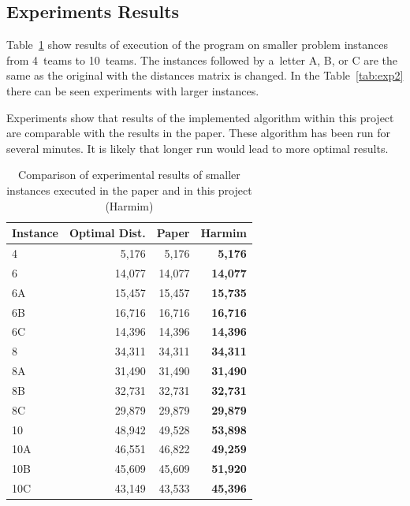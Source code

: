 \documentclass[a4paper, 10pt, twocolumn]{article}
\begin{document}
    \subsection{Experiments Results}

    Table~\ref{tab:exp1} show results of execution of the program on
    smaller problem instances from 4~teams to 10~teams. The instances
    followed by a~letter A, B, or C are the same as the original with
    the distances matrix is changed. In the Table~\ref{tab:exp2} there
    can be seen experiments with larger instances.

    Experiments show that results of the implemented algorithm within this
    project are comparable with the results in the paper. These algorithm
    has been run for several minutes. It is likely that longer run would
    lead to more optimal results.

    \begin{table}[hbt]
        \centering

        \begin{tabular}{|l||r|r|r|}
            \hline
            Instance & Optimal Dist. & Paper & \textbf{Harmim} \\
            \hline \hline

            4 & 5,176 & 5,176 & \textbf{5,176} \\ \hline
            6 & 14,077 & 14,077 & \textbf{14,077} \\ \hline
            6A & 15,457 & 15,457 & \textbf{15,735} \\ \hline
            6B & 16,716 & 16,716 & \textbf{16,716} \\ \hline
            6C & 14,396 & 14,396 & \textbf{14,396} \\ \hline
            8 & 34,311 & 34,311 & \textbf{34,311} \\ \hline
            8A & 31,490 & 31,490 & \textbf{31,490} \\ \hline
            8B & 32,731 & 32,731 & \textbf{32,731} \\ \hline
            8C & 29,879 & 29,879 & \textbf{29,879} \\ \hline
            10 & 48,942 & 49,528 & \textbf{53,898} \\ \hline
            10A & 46,551 & 46,822 & \textbf{49,259} \\ \hline
            10B & 45,609 & 45,609 & \textbf{51,920} \\ \hline
            10C & 43,149 & 43,533 & \textbf{45,396} \\ \hline
        \end{tabular}

        \caption{%
            Comparison of experimental results of smaller instances
            executed in the paper and in this project (Harmim)
        }
        \label{tab:exp1}
    \end{table}
\end{document}
